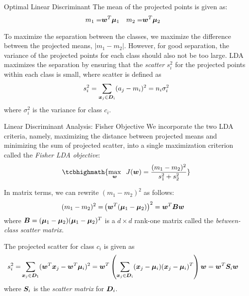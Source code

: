 \begin{frame}{Optimal Linear Discriminant}
The mean of the projected points is given as:
\begin{align*}
    m_1  = & {\boldsymbol w}^T{\bm \mu}_1 & 
	m_2 = & {\boldsymbol w}^T{\bm \mu}_2
\end{align*}

To maximize the separation between the classes, we 
maximize the difference between the projected means,
$|m_1 - m_2|$. However, for good separation,
the variance of the projected points for each class should also
not be too large. 
LDA
maximizes the separation by ensuring that the {\em
  scatter} $s_i^2$ for the projected points within each class is
small, where scatter is def\/{i}ned as
\begin{align*}
  s_i^2 = \displaystyle \sum_{{\boldsymbol x}_{j} \in {\boldsymbol D}_i} (a_{j} - m_i)^2 = n_i \sigma_i^2
\end{align*}
where $\sigma_i^2$ is the
variance for class $c_i$.
\end{frame}



\begin{frame}{Linear Discriminant Analysis: F{i}sher Objective}
  \small
We incorporate the two LDA criteria, namely, maximizing the
distance between projected means and minimizing the sum of
projected scatter, into a single maximization criterion called the
{\em F{i}sher LDA objective}: 
\begin{align*}
\tcbhighmath{
    \max_{\bw} \;\; J(\bw) = \frac{(m_1 - m_2)^2}{s_1^2 + s_2^2}
}
\end{align*}

\medskip
In matrix terms, we can rewrite $(m_1 - m_2)^2$ as follows:
\begin{align*}
  (m_1 - m_2)^2 = & \left({\boldsymbol w}^T({\bm \mu}_1 - {\bm \mu}_2)\right)^2 = {\boldsymbol w}^T{\boldsymbol B}{\boldsymbol w}
\end{align*}
where ${\boldsymbol B} = ({\bm \mu}_1 - {\bm \mu}_2) ({\bm \mu}_1 - {\bm \mu}_2)^T$ is a $d\times
d$ rank-one matrix called the {\em between-class scatter matrix}.

\medskip
The projected scatter for class $c_i$ is given as
\begin{align*}
  s_i^2 = &
  \displaystyle \sum_{{\boldsymbol x}_j \in {\boldsymbol D}_1} ({\boldsymbol w}^T{\boldsymbol x}_j - {\boldsymbol w}^T{\bm \mu}_i)^2
  =  {\boldsymbol w}^T \left(\displaystyle \sum_{{\boldsymbol x}_j \in {\boldsymbol D}_i} ({\boldsymbol x}_j - {\bm \mu}_i)({\boldsymbol x}_j -
  {\bm \mu}_i)^T \right) {\boldsymbol w}
  =  {\boldsymbol w}^T{\boldsymbol S}_i{\boldsymbol w}
\end{align*}
where ${\boldsymbol S}_i$ is the {\em scatter matrix} for ${\boldsymbol D}_i$.
\end{frame}


